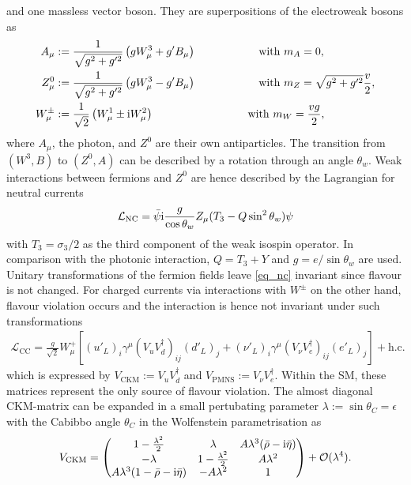 and one massless vector boson. They are superpositions of the electroweak bosons as 
\begin{align}
 A_\mu & := \frac{1}{\sqrt{g^2+g'^2}}\left(gW^3_\mu + g'B_\mu\right)\hspace{2cm}\text{with }m_A = 0,\\
 Z^0_\mu & := \frac{1}{\sqrt{g^2+g'^2}}\left(gW^3_\mu - g'B_\mu\right)\hspace{2cm}\text{with }m_Z = \sqrt{g^2+g'^2}\frac{v}{2},\\
 W^\pm_\mu &:= \frac{1}{\sqrt{2}}\left(W^1_\mu \pm \ti W^2_\mu\right)\hspace{3cm}\text{with }m_W=\frac{vg}{2},
\end{align}
where $A_\mu$, the photon, and $Z^0$ are their own antiparticles. The transition from $(W^3,B)$ to $(Z^0,A)$ can be described by a rotation 
through an angle $\theta_w$. Weak interactions
between fermions and $Z^0$ are hence described by the Lagrangian for neutral currents
\begin{align}
 \mathcal{L}_\text{NC} = \bar \psi \text{i}\frac{g}{\cos\theta_w}Z_\mu(T_3-Q\sin^2\theta_w) \psi
 \label{eq_nc}
\end{align}
with $T_3=\sigma_3/2$ as the third component of the weak isospin operator. In comparison with the photonic interaction, $Q=T_3+Y$ and 
$g=e/\sin\theta_w$ are used. Unitary transformations of the fermion fields leave \eqref{eq_nc} invariant since flavour is not changed. For 
charged currents via interactions with $W^\pm$ on the other hand, flavour violation occurs and the interaction is hence not invariant under
such transformations
\begin{align}
 \mathcal{L}_\text{CC} = \frac{g}{\sqrt{2}} W^+_\mu \left[(u'_L)_i \gamma^\mu(V_u V^\dagger_d)_{ij} (d'_L)_j + (\nu'_L)_i \gamma^\mu(V_\nu V^\dagger_e)_{ij} (e'_L)_j\right] + \text{h.c.}
 \label{eq_cc}
\end{align}
which is expressed by $V_\text{CKM}:=V_uV^\dagger_d$ and $V_\text{PMNS}:=V_\nu V^\dagger_e$. Within the SM, these matrices represent the only
source of flavour violation. The almost diagonal CKM-matrix can be expanded in a small pertubating parameter $\lambda:=\sin\theta_C=\epsilon$ with
the Cabibbo angle $\theta_C$ in the Wolfenstein parametrisation as
\begin{align}
 V_\text{CKM} = \begin{pmatrix}
                 1-\frac{\lambda^2}{2} & \lambda & A\lambda^3(\bar\rho -\text{i} \bar\eta)\\
                 -\lambda & 1-\frac{\lambda^2}{2} & A\lambda^2\\
                 A\lambda^3(1-\bar\rho -\text{i} \bar\eta) & -A\lambda^2 & 1
                \end{pmatrix} + \mathcal{O}(\lambda^4).
            \label{eq_ckm}
\end{align}
